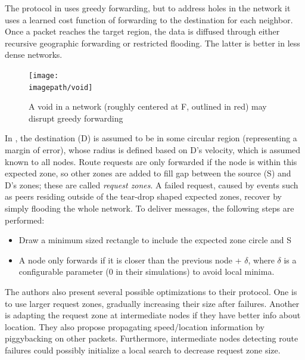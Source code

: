 \documentclass[conference]{IEEEtran}
\newcommand{\imagepath}{../../images/external/location_routing}
\begin{document}
The protocol in \cite{Yu01geographicaland} uses greedy forwarding, but to address holes in the network it uses a learned cost function of forwarding to the destination for each neighbor.  Once a packet reaches the target region, the data is diffused through either recursive geographic forwarding or restricted flooding.  The latter is better in less dense networks.

\begin{figure}
\label{fig:network-void}
\centering
\texttt{[image: \\imagepath/void]}
\caption{A void in a network (roughly centered at F, outlined in red) may disrupt greedy forwarding}
\end{figure}


In \cite{Ko98location-aidedrouting}, the destination (D) is assumed to be in some circular region (representing a margin of error), whose radius is defined based on D's velocity, which is assumed known to all nodes.
Route requests are only forwarded if the node is within this expected zone, so other zones are added to fill gap between the source (S) and D's zones; these are called \emph{request zones}.
A failed request, caused by events such as peers residing outside of the tear-drop shaped expected zones, recover by simply flooding the whole network.
To deliver messages, the following steps are performed:
\begin{itemize}
 	\item Draw a minimum sized rectangle to include the expected zone circle and S
	\item A node only forwards if it is closer than the previous node + $\delta$, where $\delta$ is a configurable parameter (0 in their simulations) to avoid local minima.
\end{itemize}


The authors also present several possible optimizations to their protocol.
One is to use larger request zones, gradually increasing their size after failures.
Another is adapting the request zone at intermediate nodes if they have better info about location.
They also propose propagating speed/location information by piggybacking on other packets.
Furthermore, intermediate nodes detecting route failures could possibly initialize a local search to decrease request zone size.
\end{document}
